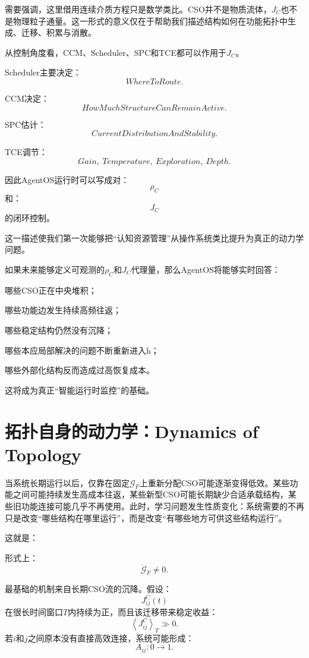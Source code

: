 需要强调，这里借用连续介质方程只是数学类比。CSO并不是物质流体，$J_C$也不是物理粒子通量。这一形式的意义仅在于帮助我们描述结构如何在功能拓扑中生成、迁移、积累与消散。

从控制角度看，CCM、Scheduler、SPC和TCE都可以作用于$J_C$。

Scheduler主要决定：
\[
WhereToRoute.
\]

CCM决定：
\[
HowMuchStructureCanRemainActive.
\]

SPC估计：
\[
CurrentDistributionAndStability.
\]

TCE调节：
\[
Gain,\ Temperature,\ Exploration,\ Depth.
\]

因此AgentOS运行时可以写成对：
\[
\rho_C
\]
和：
\[
J_C
\]
的闭环控制。

这一描述使我们第一次能够把“认知资源管理”从操作系统类比提升为真正的动力学问题。

如果未来能够定义可观测的$\rho_C$和$J_C$代理量，那么AgentOS将能够实时回答：

哪些CSO正在中央堆积；

哪些功能边发生持续高频往返；

哪些稳定结构仍然没有沉降；

哪些本应局部解决的问题不断重新进入h；

哪些外部化结构反而造成过高恢复成本。

这将成为真正“智能运行时监控”的基础。

\section{拓扑自身的动力学：Dynamics of Topology}

当系统长期运行以后，仅靠在固定$\mathcal G_F$上重新分配CSO可能逐渐变得低效。某些功能之间可能持续发生高成本往返，某些新型CSO可能长期缺少合适承载结构，某些旧功能连接可能几乎不再使用。此时，学习问题发生性质变化：系统需要的不再只是改变“哪些结构在哪里运行”，而是改变“有哪些地方可供这些结构运行”。

这就是：
\begin{statementbox}
\centering
{}
\end{statementbox}

形式上：
\[
\boxed{
\dot{\mathcal G}_F\neq0.
}
\]

最基础的机制来自长期CSO流的沉降。假设：
\[
J^{C}_{ij}(t)
\]
在很长时间窗口$T$内持续为正，而且该迁移带来稳定收益：
\[
\left\langle
J^{C}_{ij}
\right\rangle_T
\gg0.
\]
若$i$和$j$之间原本没有直接高效连接，系统可能形成：
\[
A_{ij}:0\rightarrow1.
\]

